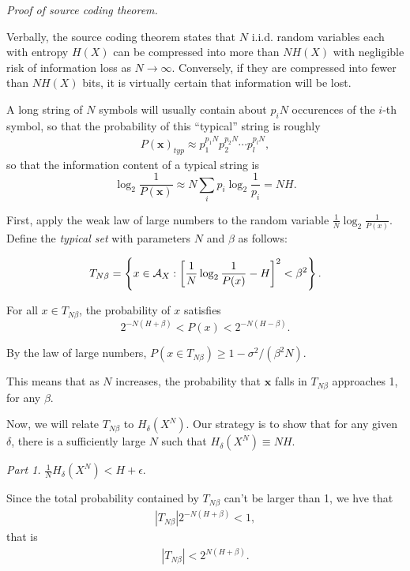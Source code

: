 \documentclass[12pt]{extarticle}
\newcommand{\mbf}{\mathbf}
\begin{document}
{\it Proof of source coding theorem.}

Verbally, the source coding theorem states that $N$ i.i.d. random variables each with entropy $H(X)$ can be compressed into more than $N H(X)$ with negligible risk of information loss as $N \to \infty$.  Conversely, if they are compressed into fewer than $NH(X)$ bits, it is virtually certain that information will be lost.

A long string of $N$ symbols will usually contain about $p_i N$ occurences of the $i$-th symbol, so that the probability of this ``typical'' string is roughly
\begin{align*}
  P(\mbf{x})_{typ} \approx p_1^{p_1N} p_2^{p_2 N} \cdots p_l^{p_l N},
\end{align*}
so that the information content of a typical string is 
\[
  \log_2 \frac{1}{P(\mbf{x})} \approx N \sum_{i} p_i \log_2 \frac{1}{p_i} = NH.
\]

First, apply the weak law of large numbers to the random variable $\frac{1}{N} \log_2 \frac{1}{P(x)}$.  Define the {\it typical set} with parameters $N$ and $\beta$ as follows:

\begin{align*}
  T_{N \beta} = \left\{ x \in \AA_{X}: \left[ \frac{1}{N} \log_2 \frac{1}{P(x)} - H \right]^2 < \beta^2 \right\}.
\end{align*}

For all $x \in T_{N \beta}$, the probability of $x$ satisfies 
\[
  2^{-N (H + \beta)} < P(x) < 2^{-N (H- \beta)}.
\]

  By the law of large numbers, $P(x \in T_{N \beta}) \geq 1 - \sigma^2 / (\beta^2 N)$.

  This means that as $N$ increases, the probability that $\mathbf{x}$ falls in $T_{N \beta}$ approaches 1, for any $\beta$.

  Now, we will relate $T_{N \beta}$ to $H_{\delta}(X^N)$.   Our strategy is to show that for any given $\delta$, there is a sufficiently large $N$ such that $H_{\delta}(X^N) \equiv NH$.

  {\it Part 1.} $\frac{1}{N} H_{\delta}(X^N) < H + \epsilon$.

  Since the total probability contained by $T_{N \beta}$ can't be larger than 1, we hve that
  \begin{align*}
    |T_{N \beta}| 2^{-N (H + \beta)} < 1,
  \end{align*}
  that is
  \begin{align*}
    |T_{N \beta}| < 2^{N (H + \beta)}.
  \end{align*}
\end{document}
